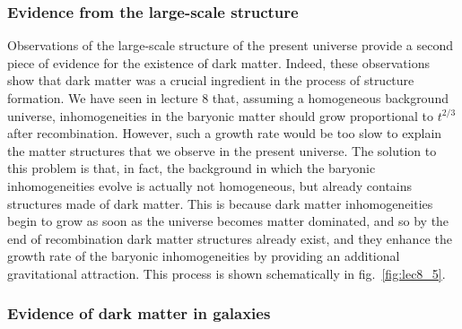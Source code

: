 \documentclass[11pt, a4paper,oneside,openright]{book}
\numberwithin{equation}{section}
\begin{document}
\subsubsection{Evidence from the large-scale structure}

Observations of the large-scale structure of the present universe provide a second piece of evidence for the existence of dark matter. Indeed, these observations show that dark matter was a crucial ingredient in the process of structure formation. We have seen in lecture 8 that, assuming a homogeneous background universe, inhomogeneities in the baryonic matter should grow proportional to $t^{2/3}$ after recombination. However, such a growth rate would be too slow to explain the matter structures that we observe in the present universe. The solution to this problem is that, in fact, the background in which the baryonic inhomogeneities evolve is actually not homogeneous, but already contains structures made of dark matter. This is because dark matter inhomogeneities begin to grow as soon as the universe becomes matter dominated, and so by the end of recombination dark matter structures already exist, and they enhance the growth rate of the baryonic inhomogeneities by providing an additional gravitational 
attraction. This process is shown schematically in fig.\ \ref{fig:lec8_5}.

\subsubsection{Evidence of dark matter in galaxies}
\end{document}

